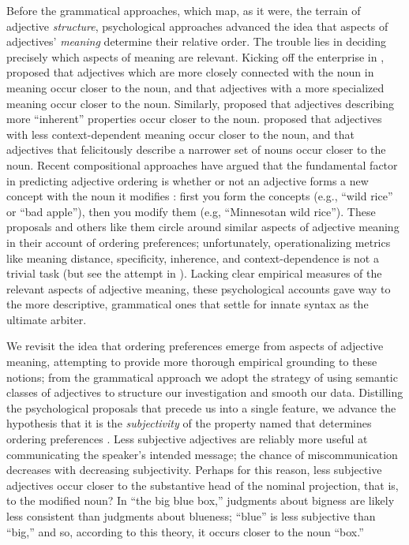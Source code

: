 \documentclass[12pt]{article}
\begin{document}
Before the grammatical approaches, which map, as it were, the terrain of adjective \emph{structure}, psychological approaches advanced the idea that aspects of adjectives' \emph{meaning} determine their relative order. The trouble lies in deciding precisely which aspects of meaning are relevant. 
Kicking off the enterprise in \citeyear{sweet1898}, \citeauthor{sweet1898} proposed that adjectives which are more closely connected with the noun in meaning occur closer to the noun, and that adjectives with a more specialized meaning occur closer to the noun. Similarly, \cite{whorf1945} proposed that adjectives describing more ``inherent'' properties occur closer to the noun. \cite{ziff1960} proposed that adjectives with less context-dependent meaning occur closer to the noun, and that adjectives that felicitously describe a narrower set of nouns occur closer to the noun. Recent compositional approaches have argued that the fundamental factor in predicting adjective ordering is whether or not an adjective forms a new concept with the noun it modifies \citep{McNally2004,svenonius2008}: first you form the concepts (e.g., ``wild rice'' or ``bad apple''), then you modify them (e.g, ``Minnesotan wild rice'').  These proposals and others like them circle around similar aspects of adjective meaning in their account of ordering preferences; unfortunately, operationalizing metrics like meaning distance, specificity, inherence, and context-dependence is not a trivial task (but see the attempt in \citealp{martin1969}). 
Lacking clear empirical measures of the relevant aspects of adjective meaning, these psychological accounts gave way to the more descriptive, grammatical ones that settle for innate syntax as the ultimate arbiter. 

We revisit the idea that ordering preferences emerge from aspects of adjective meaning, attempting to provide more thorough empirical grounding to these notions;
from the grammatical approach we adopt the strategy of using semantic classes of adjectives to structure our investigation and smooth our data. 
Distilling the psychological proposals that precede us into a single feature, we advance the hypothesis that it is the \emph{subjectivity} of the property named that determines ordering preferences \citep{hetzron1978,Quirk1985,hill2012}.
Less subjective adjectives are reliably more useful at communicating the speaker's intended message; the chance of miscommunication decreases with decreasing subjectivity. 
Perhaps for this reason, less subjective adjectives occur closer to the substantive head of the nominal projection, that is, to the modified noun?  
In ``the big blue box,'' judgments about bigness are likely less consistent than judgments about blueness; ``blue'' is less subjective than ``big,'' and so, according to this theory, it occurs closer to the noun ``box.''
\end{document}
